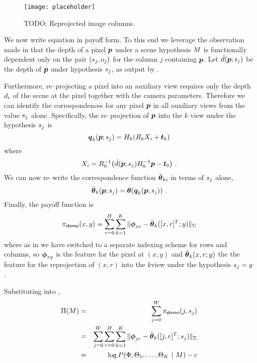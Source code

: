 \begin{figure}[tb]
  \centering \texttt{[image: placeholder]}
  \caption{TODO: Reprojected image columns.}
  \label{fig:reprojected-columns}
\end{figure}

We now write equation  in payoff form. To this
end we leverage the observation made in 
that the depth of a pixel $\Pixel$ under a scene hypothesis $\Scene$
is functionally dependent only on the pair $(\seam_j,\WallOrient_j)$
for the column $j$ containing $\Pixel$. Let
$\ComputedDepth(\Pixel;\seam_j)$ be the depth of $\Pixel$ under
hypothesis $\seam_j$, as output by .

Furthermore, re--projecting a pixel into an auxiliary view requires
only the depth $\Depth_i$ of the scene at the pixel together with the
camera parameters. Therefore we can identify the correspondences for
any pixel $\Pixel$ in all auxiliary views from the value $\seam_j$
alone. Specifically, the re--projection of $\Pixel$ into the $k$\th
view under the hypothesis $\seam_j$ is
\begin{equation}
  \AuxPixel_k(\Pixel;\seam_j) = \CamMatrix_k (\CamR_k X_i + \CamTr_k)
\end{equation}
where
\begin{equation}
  X_i = 
  \CamR_0^{-1} \bigl(
    \bar{\Depth}(\Pixel;\seam_j) \CamMatrix_0^{-1} \Pixel - \CamTr_0
  \bigr) ~.
\end{equation}
We can now re--write the correspondence function
$\ComputedAuxFeature_{ki}$ in terms of $\seam_j$ alone,
\begin{equation}
  \ComputedAuxFeature_k(\Pixel;\seam_j) = 
    \AuxFeature(\AuxPixel_k(\Pixel;\seam_j)) ~.
\end{equation}
Finally, the payoff function is
\begin{equation}
  \label{eq:stereo-payoffs}
  \StereoPayoff(x,y) = \sum_{r=0}^H \sum_{k=1}^{\NumViews}
    \| \Feature_{xr} - \ComputedAuxFeature_k([x,r]^T;y) \|_\Sigma
\end{equation}
where as in  we have switched to a separate
indexing scheme for rows and columns, so $\Feature_{xy}$ is the
feature for the pixel at $(x,y)$ and $\ComputedAuxFeature_k(x,r;y)$
the the feature for the reprojection of $(x,r)$ into the $k$\th view
under the hypothesis $\seam_j=y$.

Substituting  into ,
\begin{eqnarray}
  \ScenePayoff(\Scene) &=& 
    \sum_{j=0}^W \StereoPayoff(j,\seam_j)\\
  &=&
    \sum_{j=0}^W \sum_{r=0}^H \sum_{k=1}^{\NumViews}
    \| \Feature_{jr} - \ComputedAuxFeature_k([j,r]^T;\seam_j) \|_\Sigma\\
  &=&
    \log P(\Features,\AuxFeatures_1,\ldots,\AuxFeatures_{\NumViews}
             ~|~ \Scene) - c
\end{eqnarray}

